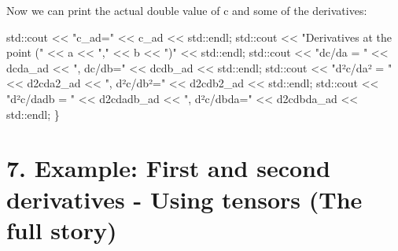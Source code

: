  Now we can print the actual double value of c and some of the derivatives\+: 
\begin{DoxyCode}
     std::cout << \textcolor{stringliteral}{"c\_ad="} << c\_ad << std::endl;
     std::cout << \textcolor{stringliteral}{"Derivatives at the point ("} << a << \textcolor{stringliteral}{","} << b << \textcolor{stringliteral}{")"} << std::endl;
     std::cout << \textcolor{stringliteral}{"dc/da = "} << dcda\_ad << \textcolor{stringliteral}{", dc/db="} << dcdb\_ad << std::endl;
     std::cout << \textcolor{stringliteral}{"d²c/da² = "} << d2cda2\_ad << \textcolor{stringliteral}{", d²c/db²="} << d2cdb2\_ad << std::endl;
     std::cout << \textcolor{stringliteral}{"d²c/dadb = "} << d2cdadb\_ad << \textcolor{stringliteral}{", d²c/dbda="} << d2cdbda\_ad << std::endl;
\}
\end{DoxyCode}
 \hypertarget{index_Ex7}{}\section{7. Example\+: First and second derivatives -\/ Using tensors (\+The full story)}\label{index_Ex7}

